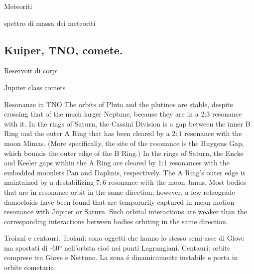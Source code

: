 \begin{frame}{Meteoriti}

\end{frame}

\begin{wordonframe}{spettro di massa dei meteoriti}

\end{wordonframe}

\subsection{Kuiper, TNO, comete.}

\begin{frame}{Reservoir di corpi}

\end{frame}

\begin{wordonframe}{Jupiter class comets}

\end{wordonframe}

\begin{frame}{Resonanze in TNO}
The orbits of Pluto and the plutinos are stable, despite crossing that of the much larger Neptune, because they are in a 2:3 resonance with it.
In the rings of Saturn, the Cassini Division is a gap between the inner B Ring and the outer A Ring that has been cleared by a $2:1$ resonance with the moon Mimas. (More specifically, the site of the resonance is the Huygens Gap, which bounds the outer edge of the B Ring.)
    In the rings of Saturn, the Encke and Keeler gaps within the A Ring are cleared by 1:1 resonances with the embedded moonlets Pan and Daphnis, respectively. The A Ring's outer edge is maintained by a destabilizing $7:6$ resonance with the moon Janus.
Most bodies that are in resonance orbit in the same direction; however, a few retrograde damocloids have been found that are temporarily captured in mean-motion resonance with Jupiter or Saturn. Such orbital interactions are weaker than the corresponding interactions between bodies orbiting in the same direction.
\end{frame}

\begin{frame}{Troiani e centauri.}
Troiani: sono oggetti che hanno lo stesso semi-asse di Giove ma spostati di \ang{+-60} nell'orbita cio\'e nei punti Lagrangiani.
Centauri: orbite comprese tra Giove e Nettuno. La zona \'e dinamicamente instabile e porta in orbite cometaria.
\end{frame}

